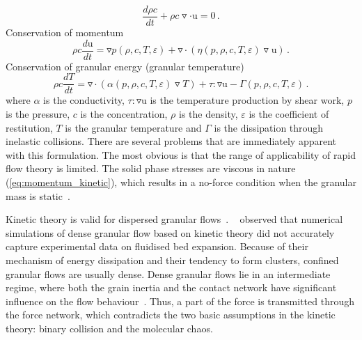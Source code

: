 \begin{equation}
\frac{d \rho c}{dt} + \rho c \triangledown \cdot \mathrm{u} = 0 \,.
\end{equation}
\noindent Conservation of momentum
\begin{equation}
\label{eq:momentum_kinetic}
\rho c \frac{d \mathrm{u}}{dt} = \triangledown p(\rho,c,T,\varepsilon) + 
\triangledown \cdot ( \eta (p,\rho,c,T,\varepsilon)  \triangledown \mathrm{u}) 
\,.
\end{equation}
\noindent Conservation of granular energy (granular temperature)
\begin{equation}
\rho c \frac{d T}{dt} = \triangledown \cdot ( \alpha (p,\rho, c, 
T,\varepsilon)  
\triangledown T) + \tau : \triangledown \mathrm{u} - \Gamma 
(p,\rho,c,T,\varepsilon)  \,.
\end{equation}
where $\alpha$ is the conductivity, $\tau : \triangledown \mathrm{u}$ is the 
temperature production by shear work, $p$ is the pressure, $c$ is the 
concentration, $\rho$ is the density, $\varepsilon$ is the coefficient of 
restitution, $T$ is the granular temperature and $\Gamma$ is the dissipation 
through 
inelastic collisions. There are several problems that are immediately
apparent with this formulation. The most obvious is that the
range of applicability of rapid flow theory is limited. The solid phase 
stresses are viscous in nature (\cref{eq:momentum_kinetic}), which results in 
a no-force condition when the granular mass is static~\citep{Campbell2006}.

Kinetic theory is valid for dispersed granular flows~\citep{Ng2008}.
~\citet{VanWachem2001} observed that numerical simulations of dense 
granular flow based on kinetic theory did not accurately capture
experimental data on fluidised bed expansion. Because of their mechanism of 
energy dissipation and their tendency to form clusters, confined granular flows 
are usually dense. Dense granular flows lie in an intermediate 
regime, where both the grain inertia and the contact network have significant 
influence on the flow behaviour~\citep{Pouliquen2002}. Thus, a part of the 
force is transmitted through the force network, which contradicts the two basic 
assumptions in the kinetic theory: binary collision and the molecular 
chaos. 

